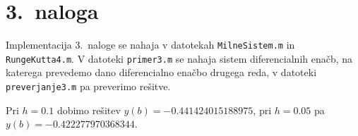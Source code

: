 \documentclass[a4paper,12pt]{article}
\begin{document}
\section*{3.\ naloga}

Implementacija 3.\ naloge se nahaja v datotekah \texttt{MilneSistem.m}
in \texttt{RungeKutta4.m}. V datoteki \texttt{primer3.m} se nahaja sistem 
diferencialnih enačb, na katerega prevedemo dano diferencialno enačbo drugega reda,
v datoteki \texttt{preverjanje3.m} pa preverimo rešitve.

Pri $h=0.1$ dobimo rešitev $y(b)=-0.441424015188975$, pri $h=0.05$ pa 
$y(b)=-0.422277970368344$.
\end{document}
